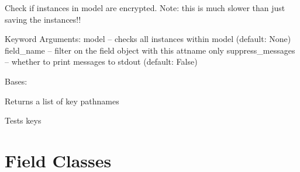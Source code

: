 \documentclass[letterpaper,10pt,english]{sphinxmanual}
\begin{document}
\begin{fulllineitems}
\begin{fulllineitems}
\end{fulllineitems}


\begin{fulllineitems}
\label{base_classes:bhp_crypto.classes.ModelCryptor.is_model_encrypted}
Check if instances in model are encrypted.
Note: this is much slower than just saving the instances!!

Keyword Arguments:
model -- checks all instances within model (default: None)
field\_name -- filter on the field object with this attname only
suppress\_messages -- whether to print messages to stdout (default: False)

\end{fulllineitems}


\end{fulllineitems}


\begin{fulllineitems}
\label{base_classes:bhp_crypto.classes.KeyGenerator}
Bases: 

\begin{fulllineitems}
\label{base_classes:bhp_crypto.classes.KeyGenerator.get_key_paths}
Returns a list of key pathnames

\end{fulllineitems}


\begin{fulllineitems}
\label{base_classes:bhp_crypto.classes.KeyGenerator.test_keys}
Tests keys

\end{fulllineitems}


\end{fulllineitems}



\chapter{Field Classes}
\label{field_classes::doc}\label{field_classes:field-classes}
\end{document}
